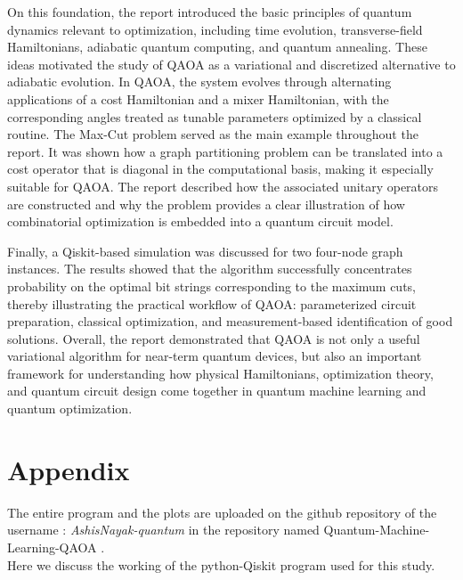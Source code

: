 \documentclass[english,12pt,a4paper]{report}
\begin{document}
	On this foundation, the report introduced the basic principles of quantum dynamics relevant to optimization, including time evolution, transverse-field Hamiltonians, adiabatic quantum computing, and quantum annealing. These ideas motivated the study of QAOA as a variational and discretized alternative to adiabatic evolution. In QAOA, the system evolves through alternating applications of a cost Hamiltonian and a mixer Hamiltonian, with the corresponding angles treated as tunable parameters optimized by a classical routine.
	The Max-Cut problem served as the main example throughout the report. It was shown how a graph partitioning problem can be translated into a cost operator that is diagonal in the computational basis, making it especially suitable for QAOA. The report described how the associated unitary operators are constructed and why the problem provides a clear illustration of how combinatorial optimization is embedded into a quantum circuit model.
	
	Finally, a Qiskit-based simulation was discussed for two four-node graph instances. The results showed that the algorithm successfully concentrates probability on the optimal bit strings corresponding to the maximum cuts, thereby illustrating the practical workflow of QAOA: parameterized circuit preparation, classical optimization, and measurement-based identification of good solutions. Overall, the report demonstrated that QAOA is not only a useful variational algorithm for near-term quantum devices, but also an important framework for understanding how physical Hamiltonians, optimization theory, and quantum circuit design come together in quantum machine learning and quantum optimization.
	
	\chapter*{Appendix}\label{app}
	The entire program and the plots are uploaded on the github repository of the username : \emph{AshisNayak-quantum} in the repository named Quantum-Machine-Learning-QAOA \cite{Quantum-Machine-Learning-QAOA}.
	\\Here we discuss the working of the python-Qiskit program used for this study.
	
	
\end{document}
